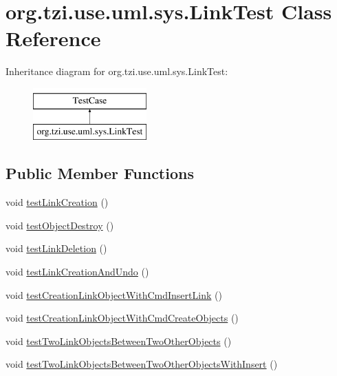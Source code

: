 \hypertarget{classorg_1_1tzi_1_1use_1_1uml_1_1sys_1_1_link_test}{\section{org.\-tzi.\-use.\-uml.\-sys.\-Link\-Test Class Reference}
\label{classorg_1_1tzi_1_1use_1_1uml_1_1sys_1_1_link_test}
}
Inheritance diagram for org.\-tzi.\-use.\-uml.\-sys.\-Link\-Test\-:\begin{figure}[H]
\begin{center}
\leavevmode
\includegraphics[height=2.000000cm]{classorg_1_1tzi_1_1use_1_1uml_1_1sys_1_1_link_test}
\end{center}
\end{figure}
\subsection*{Public Member Functions}
\begin{DoxyCompactItemize}
\item 
void \hyperlink{classorg_1_1tzi_1_1use_1_1uml_1_1sys_1_1_link_test_a667ee9f254499cd17ef36edbf8df1589}{test\-Link\-Creation} ()
\item 
void \hyperlink{classorg_1_1tzi_1_1use_1_1uml_1_1sys_1_1_link_test_a7e600d1afa397ca835e7f9a80544475e}{test\-Object\-Destroy} ()
\item 
void \hyperlink{classorg_1_1tzi_1_1use_1_1uml_1_1sys_1_1_link_test_a2ed9c9770fb8cc2436832cd7e645c8c5}{test\-Link\-Deletion} ()
\item 
void \hyperlink{classorg_1_1tzi_1_1use_1_1uml_1_1sys_1_1_link_test_a0d1d160b690aaac230f31988dc1086a2}{test\-Link\-Creation\-And\-Undo} ()
\item 
void \hyperlink{classorg_1_1tzi_1_1use_1_1uml_1_1sys_1_1_link_test_a8eb75ba1256ee131910783c4da02418a}{test\-Creation\-Link\-Object\-With\-Cmd\-Insert\-Link} ()
\item 
void \hyperlink{classorg_1_1tzi_1_1use_1_1uml_1_1sys_1_1_link_test_acbef8a8d56682ac01940d801acb5baa8}{test\-Creation\-Link\-Object\-With\-Cmd\-Create\-Objects} ()
\item 
void \hyperlink{classorg_1_1tzi_1_1use_1_1uml_1_1sys_1_1_link_test_a2d5d7012122b1fb9f3336690744bf830}{test\-Two\-Link\-Objects\-Between\-Two\-Other\-Objects} ()
\item 
void \hyperlink{classorg_1_1tzi_1_1use_1_1uml_1_1sys_1_1_link_test_af7c97772553468cb68883bdb694322ab}{test\-Two\-Link\-Objects\-Between\-Two\-Other\-Objects\-With\-Insert} ()
\end{DoxyCompactItemize}
